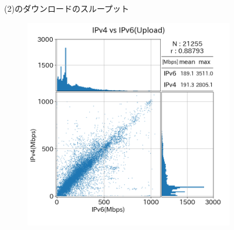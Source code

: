 \begin{figure}[htbp]
\begin{center}
\begin{subfigure}[b]{0.49\textwidth}
            \label{new_diffISP_dl}
        \end{subfigure}
        \caption{(2)のダウンロードのスループット}
        \label{fig:new_isp_dl}
    \end{center}
\end{figure}
\FloatBarrier

\begin{figure}[htbp]
    \begin{center}
        \begin{subfigure}[b]{0.49\textwidth}
            \centering
            \includegraphics[width=1.0\textwidth]{fig/old_sameISP_ul.png}
            \label{old_sameISP_ul}
        \end{subfigure}
        \begin{subfigure}[b]{0.49\textwidth}
            \centering

\end{subfigure}
\end{center}
\end{figure}
